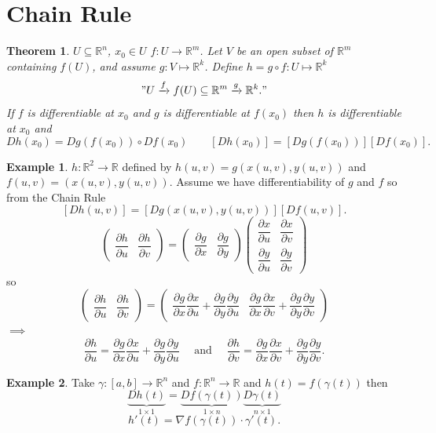 \documentclass[11pt,openany]{book}
\theoremstyle{plain}
\newtheorem{theorem}{Theorem}[chapter]
\theoremstyle{definition}
\newtheorem{example}{Example}[chapter]
\theoremstyle{remark}
\newcommand{\R}{\mathbb{R}}
\newcommand{\dell}[2]{\dfrac{\partial #1}{\partial #2}}
\begin{document}
\section{Chain Rule}

\begin{theorem}
    $U \subseteq \R^n$, $x_0\in U$ $f: U \to \R^m$. Let $V$ be an open subset of $\mathbb R^m$ containing $f(U)$, and assume $g:V\mapsto \mathbb R^k$. Define $h=g\circ f: U\mapsto \mathbb R^k$
    \[ " U \xrightarrow{f} f(U)\subseteq \R^m \xrightarrow{g} \R^k ."\] 
    If $f$ is differentiable at $x_0$ and $g$ is differentiable at $f(x_0)$ then $h$
    is differentiable at $x_0$ and 
    \[Dh(x_0) = Dg(f(x_0)) \circ Df(x_0)\qquad [Dh(x_0)]=[Dg(f(x_0))][Df(x_0)].\]
\end{theorem}

\begin{example}
    $h: \R^2 \to \R$ defined by $h(u,v) = g(x(u,v), y(u,v))$ and $f(u,v) = (x(u,v), y(u,v)).$  Assume we have differentiability of $g$ and $f$ so from the Chain Rule 
    \[[Dh(u,v)] = [Dg(x(u,v),y(u,v))][Df(u,v)].\]
    \[\begin{pmatrix} \dell{h}{u} &\dell{h}{v}\end{pmatrix} = \begin{pmatrix}
    \dell{g}{x} & \dell{g}{y}
    \end{pmatrix}\begin{pmatrix}
    \dell{x}{u} & \dell{x}{v}\\
    \dell{y}{u} & \dell{y}{v}
    \end{pmatrix}\] so \[\begin{pmatrix}
        \dell{h}{u} & \dell{h}{v}
    \end{pmatrix} = \begin{pmatrix}
        \dell{g}{x}\dell{x}{u} + \dell{g}{y}\dell{y}{u} & \dell{g}{x}\dell{x}{v} + \dell{g}{y}\dell{y}{v}
    \end{pmatrix}\] $\implies$ \[\dell{h}{u} = \dell{g}{x}\dell{x}{u} + \dell{g}{y}\dell{y}{u} \quad \text{ and } \quad \dell{h}{v} = \dell{g}{x}\dell{x}{v} + \dell{g}{y}\dell{y}{v}.\]
\end{example}

\begin{example}
    Take $\gamma: [a,b] \to \R^n$ and $f: \R^n \to \R$ and $h(t) = f(\gamma(t))$ then \[\underbrace{Dh(t)}_{1 \times 1} = \underbrace{Df(\gamma(t))}_{1 \times n} \underbrace{D\gamma(t)}_{n \times 1}\]
    \[h'(t) = \nabla f(\gamma(t))\cdot \gamma'(t). \]
\end{example}
\end{document}
